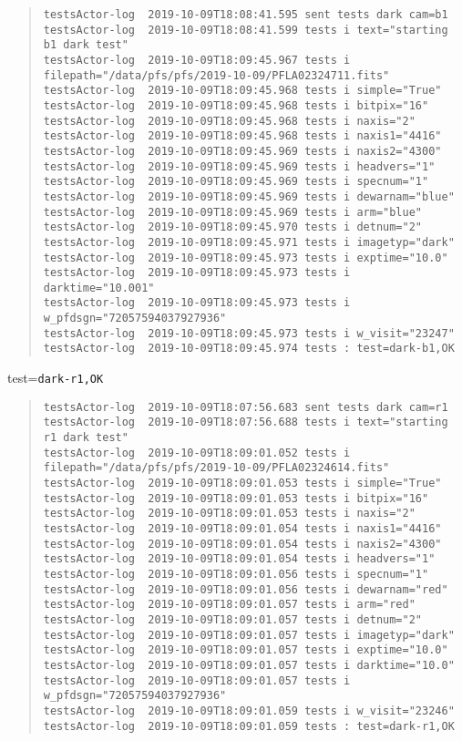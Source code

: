 \begin{quote}
\begin{tiny}
\begin{verbatim}
testsActor-log  2019-10-09T18:08:41.595 sent tests dark cam=b1
testsActor-log  2019-10-09T18:08:41.599 tests i text="starting b1 dark test"
testsActor-log  2019-10-09T18:09:45.967 tests i filepath="/data/pfs/pfs/2019-10-09/PFLA02324711.fits"
testsActor-log  2019-10-09T18:09:45.968 tests i simple="True"
testsActor-log  2019-10-09T18:09:45.968 tests i bitpix="16"
testsActor-log  2019-10-09T18:09:45.968 tests i naxis="2"
testsActor-log  2019-10-09T18:09:45.968 tests i naxis1="4416"
testsActor-log  2019-10-09T18:09:45.969 tests i naxis2="4300"
testsActor-log  2019-10-09T18:09:45.969 tests i headvers="1"
testsActor-log  2019-10-09T18:09:45.969 tests i specnum="1"
testsActor-log  2019-10-09T18:09:45.969 tests i dewarnam="blue"
testsActor-log  2019-10-09T18:09:45.969 tests i arm="blue"
testsActor-log  2019-10-09T18:09:45.970 tests i detnum="2"
testsActor-log  2019-10-09T18:09:45.971 tests i imagetyp="dark"
testsActor-log  2019-10-09T18:09:45.973 tests i exptime="10.0"
testsActor-log  2019-10-09T18:09:45.973 tests i darktime="10.001"
testsActor-log  2019-10-09T18:09:45.973 tests i w_pfdsgn="72057594037927936"
testsActor-log  2019-10-09T18:09:45.973 tests i w_visit="23247"
testsActor-log  2019-10-09T18:09:45.974 tests : test=dark-b1,OK
\end{verbatim}
\end{tiny}
\end{quote}

\noindent test=\texttt{dark-r1,OK}

\begin{quote}
\begin{tiny}
\begin{verbatim}
testsActor-log  2019-10-09T18:07:56.683 sent tests dark cam=r1
testsActor-log  2019-10-09T18:07:56.688 tests i text="starting r1 dark test"
testsActor-log  2019-10-09T18:09:01.052 tests i filepath="/data/pfs/pfs/2019-10-09/PFLA02324614.fits"
testsActor-log  2019-10-09T18:09:01.053 tests i simple="True"
testsActor-log  2019-10-09T18:09:01.053 tests i bitpix="16"
testsActor-log  2019-10-09T18:09:01.053 tests i naxis="2"
testsActor-log  2019-10-09T18:09:01.054 tests i naxis1="4416"
testsActor-log  2019-10-09T18:09:01.054 tests i naxis2="4300"
testsActor-log  2019-10-09T18:09:01.054 tests i headvers="1"
testsActor-log  2019-10-09T18:09:01.056 tests i specnum="1"
testsActor-log  2019-10-09T18:09:01.056 tests i dewarnam="red"
testsActor-log  2019-10-09T18:09:01.057 tests i arm="red"
testsActor-log  2019-10-09T18:09:01.057 tests i detnum="2"
testsActor-log  2019-10-09T18:09:01.057 tests i imagetyp="dark"
testsActor-log  2019-10-09T18:09:01.057 tests i exptime="10.0"
testsActor-log  2019-10-09T18:09:01.057 tests i darktime="10.0"
testsActor-log  2019-10-09T18:09:01.057 tests i w_pfdsgn="72057594037927936"
testsActor-log  2019-10-09T18:09:01.059 tests i w_visit="23246"
testsActor-log  2019-10-09T18:09:01.059 tests : test=dark-r1,OK
\end{verbatim}
\end{tiny}
\end{quote}

